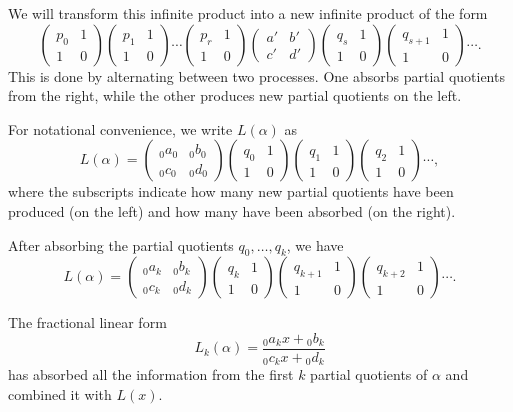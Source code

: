 \def\pq#1{\begin{pmatrix}#1& 1 \\ 1 & 0 \end{pmatrix}}
We will transform this infinite product into a new infinite product of the form
\[
\pq{p_0} \pq{p_1} \cdots \pq{p_r} 
\begin{pmatrix}a' & b' \\ c' & d' \end{pmatrix}
\pq{q_s} \pq{q_{s+1}} \cdots.
\]
This is done by alternating between two processes.  One absorbs partial
quotients from the right, while the other produces new partial
quotients on the left.  

For notational convenience, we write $L(\alpha)$ as 
\[
L(\alpha) = \begin{pmatrix}{}_0a_0&_0b_0\\ {}_0c_0&{}_0d_0\end{pmatrix} 
\begin{pmatrix}q_0&1\\ 1&0\end{pmatrix}
\begin{pmatrix}q_1&1\\ 1&0\end{pmatrix} \begin{pmatrix}q_2&1\\ 1&0\end{pmatrix} \cdots,
\]
where the subscripts indicate how many new partial quotients have been
produced (on the left) and how many have been absorbed (on the right).

After absorbing the partial quotients $q_0, \ldots, q_k$, we have
\[
L(\alpha) = \begin{pmatrix}{}_0a_k&{}_0b_k\\ {}_0c_k&{}_0d_k\end{pmatrix} \begin{pmatrix}q_k&1\\ 1&0\end{pmatrix}
\begin{pmatrix}q_{k+1}&1\\ 1&0\end{pmatrix} \begin{pmatrix}q_{k+2}&1\\ 1&0\end{pmatrix} \cdots.
\]

The fractional linear form 
\[
L_k(\alpha) = \frac{{}_0a_k x + {}_0b_k}{{}_0c_k x + {}_0d_k}
\]
has absorbed all the information from the first $k$ partial quotients
of $\alpha$ and combined it with $L(x)$.

